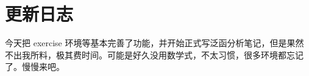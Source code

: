\chapter{更新日志}


\begin{changelog}[date = {2022-03-05}]
  今天把 exercise 环境等基本完善了功能，并开始正式写泛函分析笔记，但是果然不出我所料，极其费时间。可能是好久没用数学式，不太习惯，很多环境都忘记了。慢慢来吧。
\end{changelog}